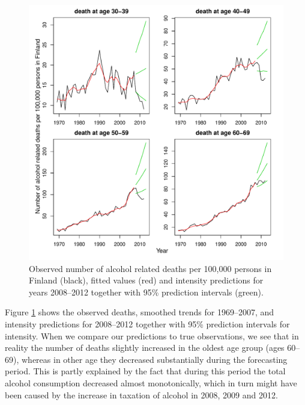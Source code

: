 \documentclass[nojss,article]{jss}\usepackage[]{graphicx}\usepackage[]{color}
\newenvironment{knitrout}{}{} %
\begin{document}
\begin{knitrout}
\begin{figure}[!ht]
\includegraphics[width=\linewidth]{figure/predictplot} \caption[Observed number of alcohol related deaths per 100,000 persons in Finland (black), fitted values (red) and intensity predictions for years 2008--2012 together with 95\% prediction intervals (green)]{Observed number of alcohol related deaths per 100,000 persons in Finland (black), fitted values (red) and intensity predictions for years 2008--2012 together with 95\% prediction intervals (green).\label{fig:predictplot}}
\end{figure}


\end{knitrout}

Figure \ref{fig:predictplot} shows the observed deaths, smoothed trends for 1969--2007, and intensity predictions for 2008--2012 together with 95\% prediction intervals for intensity. When we compare our predictions to true observations, we see that in reality the number of deaths slightly increased in the oldest age group (ages 60--69), whereas in other age they decreased substantially during the forecasting period. This is partly explained by the fact that during this period the total alcohol consumption decreased almost monotonically, which in turn might have been caused by the increase in taxation of alcohol in 2008, 2009 and 2012.
\end{document}
